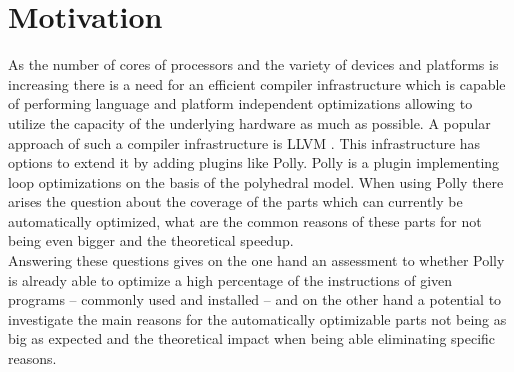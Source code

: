 \chapter{Motivation}
As the number of cores of processors and the variety of devices and platforms is increasing there is a need for an efficient compiler infrastructure which is capable of performing language and platform independent optimizations allowing to utilize the capacity of the underlying hardware as much as possible.
A popular approach of such a compiler infrastructure is LLVM \cite{LLVMUsers}.
This infrastructure has options to extend it by adding plugins like Polly.
Polly is a plugin implementing loop optimizations on the basis of the polyhedral model.
When using Polly there arises the question about the coverage of the parts which can currently be automatically optimized, what are the common reasons of these parts for not being even bigger and the theoretical speedup.\\
Answering these questions gives on the one hand an assessment to whether Polly is already able to optimize a high percentage of the instructions of given programs -- commonly used and installed -- and on the other hand a potential to investigate the main reasons for the automatically optimizable parts not being as big as expected and the theoretical impact when being able eliminating specific reasons.
